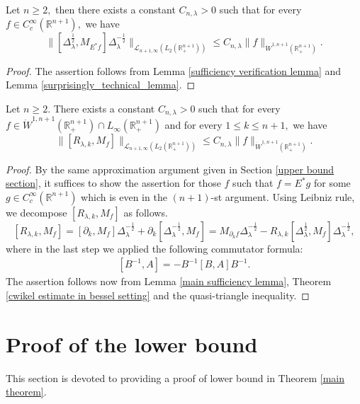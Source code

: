 \documentclass[12pt]{amsart}
\begin{document}
\begin{lemma}\label{main sufficiency lemma} Let $n\geq 2,$ then there exists a constant $C_{n,\lambda}>0$ such that for every $f\in C^{\infty}_c(\mathbb{R}^{n+1}),$ we have
$$\|[\Delta_\lambda^{\frac12},M_{E^*f}]\Delta_\lambda^{-\frac12}\|_{\mathcal{L}_{n+1,\infty}(L_2(\mathbb{R}_+^{n+1}))}\leq C_{n,\lambda}\|f\|_{\dot{W}^{1,n+1}(\mathbb{R}_+^{n+1})}.$$
\end{lemma}
\begin{proof} The assertion follows from Lemma \ref{sufficiency verification lemma} and Lemma \ref{surprisingly_technical_lemma}.
\end{proof}


\begin{proposition}\label{final sufficiency lemma} Let $n\geq 2.$ There exists a constant $C_{n,\lambda}>0$ such that for every $f\in  \dot{W}^{1,n+1}(\mathbb{R}_+^{n+1})\cap L_{\infty}(\mathbb{R}_+^{n+1})$ and for every $1\leq k\leq n+1,$ we have
$$\|[R_{\lambda,k},M_f]\|_{\mathcal{L}_{n+1,\infty}(L_2(\mathbb{R}_+^{n+1}))}\leq C_{n,\lambda}\|f\|_{\dot{W}^{1,n+1}(\mathbb{R}_+^{n+1})}.$$
\end{proposition}
\begin{proof}
By the same approximation argument given in Section \ref{upper bound section}, it suffices to show the assertion for those $f$ such that $f=E^{\ast}g$ for some $g\in C_c^\infty(\mathbb{R}^{n+1})$ which is even in the $(n+1)$-st argument. Using Leibniz rule, we decompose $[R_{\lambda,k},M_f]$ as follows.
$$[R_{\lambda,k},M_f]=[\partial_k,M_f]\Delta_\lambda^{-\frac12}+\partial_k[\Delta_\lambda^{-\frac12},M_f]=M_{\partial_k f}\Delta_\lambda^{-\frac12}-R_{\lambda,k}[\Delta_\lambda^{\frac12},M_f]\Delta_\lambda^{-\frac12},$$
where in the last step we applied the following commutator formula:
\begin{align}\label{commutator}
[B^{-1},A]=-B^{-1}[B,A]B^{-1}.
\end{align}
The assertion follows now from Lemma \ref{main sufficiency lemma}, Theorem \ref{cwikel estimate in bessel setting} and the quasi-triangle inequality.
\end{proof}

\section{Proof of the lower bound}\label{lowbd}
\setcounter{equation}{0}
This section is devoted to providing a proof of lower bound in Theorem \ref{main theorem}.
\end{document}
